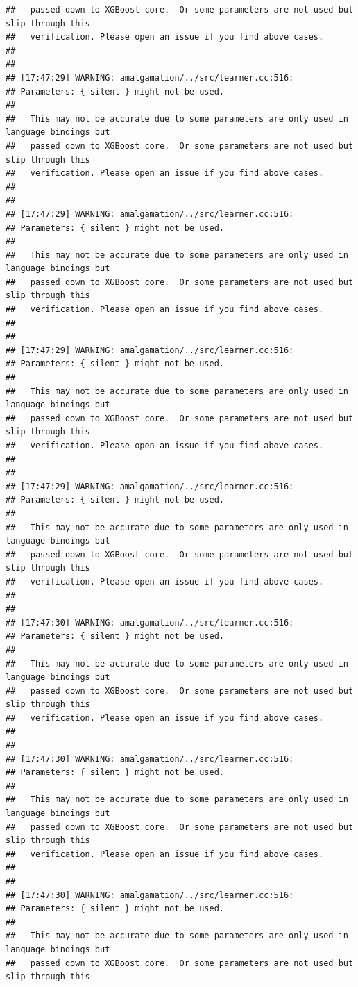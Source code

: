 \documentclass[AMS,STIX2COL]{WileyNJD-v2}\usepackage[]{graphicx}\usepackage[]{color}
\makeatletter
\newenvironment{kframe}{%
 \def\at@end@of@kframe{}%
 \ifinner\ifhmode%
  \def\at@end@of@kframe{\end{minipage}}%
  \begin{minipage}{\columnwidth}%
 \fi\fi%
 \def\FrameCommand##1{\hskip\@totalleftmargin \hskip-\fboxsep
 \colorbox{shadecolor}{##1}\hskip-\fboxsep
     \hskip-\linewidth \hskip-\@totalleftmargin \hskip\columnwidth}%
 \MakeFramed {\advance\hsize-\width
   \@totalleftmargin\z@ \linewidth\hsize
   \@setminipage}}%
 {\par\unskip\endMakeFramed%
 \at@end@of@kframe}
\newenvironment{knitrout}{}{} %
\makeatother
\begin{document}
\begin{knitrout}
\begin{kframe}
\begin{verbatim}
##   passed down to XGBoost core.  Or some parameters are not used but slip through this
##   verification. Please open an issue if you find above cases.
## 
## 
## [17:47:29] WARNING: amalgamation/../src/learner.cc:516: 
## Parameters: { silent } might not be used.
## 
##   This may not be accurate due to some parameters are only used in language bindings but
##   passed down to XGBoost core.  Or some parameters are not used but slip through this
##   verification. Please open an issue if you find above cases.
## 
## 
## [17:47:29] WARNING: amalgamation/../src/learner.cc:516: 
## Parameters: { silent } might not be used.
## 
##   This may not be accurate due to some parameters are only used in language bindings but
##   passed down to XGBoost core.  Or some parameters are not used but slip through this
##   verification. Please open an issue if you find above cases.
## 
## 
## [17:47:29] WARNING: amalgamation/../src/learner.cc:516: 
## Parameters: { silent } might not be used.
## 
##   This may not be accurate due to some parameters are only used in language bindings but
##   passed down to XGBoost core.  Or some parameters are not used but slip through this
##   verification. Please open an issue if you find above cases.
## 
## 
## [17:47:29] WARNING: amalgamation/../src/learner.cc:516: 
## Parameters: { silent } might not be used.
## 
##   This may not be accurate due to some parameters are only used in language bindings but
##   passed down to XGBoost core.  Or some parameters are not used but slip through this
##   verification. Please open an issue if you find above cases.
## 
## 
## [17:47:30] WARNING: amalgamation/../src/learner.cc:516: 
## Parameters: { silent } might not be used.
## 
##   This may not be accurate due to some parameters are only used in language bindings but
##   passed down to XGBoost core.  Or some parameters are not used but slip through this
##   verification. Please open an issue if you find above cases.
## 
## 
## [17:47:30] WARNING: amalgamation/../src/learner.cc:516: 
## Parameters: { silent } might not be used.
## 
##   This may not be accurate due to some parameters are only used in language bindings but
##   passed down to XGBoost core.  Or some parameters are not used but slip through this
##   verification. Please open an issue if you find above cases.
## 
## 
## [17:47:30] WARNING: amalgamation/../src/learner.cc:516: 
## Parameters: { silent } might not be used.
## 
##   This may not be accurate due to some parameters are only used in language bindings but
##   passed down to XGBoost core.  Or some parameters are not used but slip through this

\end{verbatim}
\end{kframe}
\end{knitrout}
\end{document}
